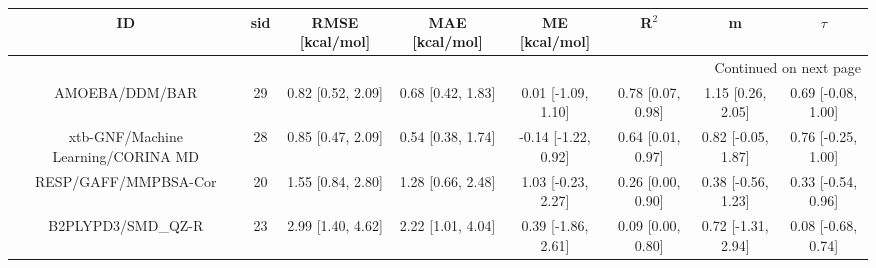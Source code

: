 \documentclass[8pt]{article}
\begin{document}
\begin{center}
\begin{footnotesize}
\begin{longtable}{|cccccccc|}
\toprule
                                 ID & sid &    RMSE [kcal/mol] &     MAE [kcal/mol] &        ME [kcal/mol] &              R$^2$ &                   m &              $\tau$ \\
\midrule
\endhead
\midrule
\multicolumn{8}{r}{{Continued on next page}} \\
\midrule
\endfoot

\bottomrule
\endlastfoot
                     AMOEBA/DDM/BAR &  29 &  0.82 [0.52, 2.09] &  0.68 [0.42, 1.83] &   0.01 [-1.09, 1.10] &  0.78 [0.07, 0.98] &   1.15 [0.26, 2.05] &  0.69 [-0.08, 1.00] \\
 xtb-GNF/Machine Learning/CORINA MD &  28 &  0.85 [0.47, 2.09] &  0.54 [0.38, 1.74] &  -0.14 [-1.22, 0.92] &  0.64 [0.01, 0.97] &  0.82 [-0.05, 1.87] &  0.76 [-0.25, 1.00] \\
               RESP/GAFF/MMPBSA-Cor &  20 &  1.55 [0.84, 2.80] &  1.28 [0.66, 2.48] &   1.03 [-0.23, 2.27] &  0.26 [0.00, 0.90] &  0.38 [-0.56, 1.23] &  0.33 [-0.54, 0.96] \\
                 B2PLYPD3/SMD\_QZ-R &  23 &  2.99 [1.40, 4.62] &  2.22 [1.01, 4.04] &   0.39 [-1.86, 2.61] &  0.09 [0.00, 0.80] &  0.72 [-1.31, 2.94] &  0.08 [-0.68, 0.74] \\
\end{longtable}
\end{footnotesize}
\end{center}
\end{document}
